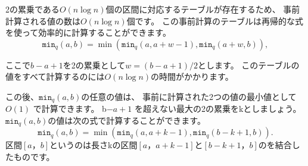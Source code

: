 2の累乗である$O(n \log n)$個の区間に対応するテーブルが存在するため、
事前計算される値の数は$O(n \log n)$個です。
この事前計算のテーブルは再帰的な式を使って効率的に計算することができます。
\[\texttt{min}_q(a,b) = \min(\texttt{min}_q(a,a+w-1),\texttt{min}_q(a+w,b)),\]

ここで$b - a + 1 $を2の累乗として$w=(b-a+1)/2$とします。
このテーブルの値をすべて計算するのには$O(n \log n)$の時間がかかります。

この後、$\texttt{min}_q(a,b)$の任意の値は、
事前に計算された2つの値の最小値として$O(1)$ で計算できます。
b$ - a + 1$ を超えない最大の2の累乗をkとしましょう。
$\texttt{min}_q(a,b)$の値は次の式で計算することができます。
\[\texttt{min}_q(a,b) = \min(\texttt{min}_q(a,a+k-1),\texttt{min}_q(b-k+1,b)).\]
区間$[a，b]$というのは長さkの区間$[a，a+k - 1]$と$[b-k+1，b]$のを結合したものです。

